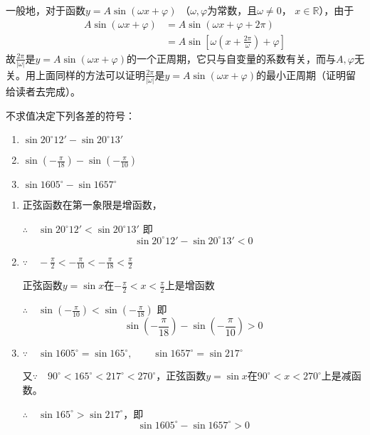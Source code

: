 一般地，对于函数$y=A\sin(\omega x+\varphi)$ （$\omega,\varphi$为常数，且$\omega\ne 0$， $x\in\mathbb{R}$），由于
\[\begin{split}
    A\sin(\omega x+\varphi)&=A\sin(\omega x+\varphi+2\pi)\\
    &=A\sin\left[\omega\left(x+\frac{2\pi}{\omega}\right)+\varphi\right]  
\end{split}\]
故$\frac{2\pi}{|\omega|}$是$y=A\sin(\omega x+\varphi)$的一个正周期，它只与自变量的系数有关，而与$A,\varphi$无关。用上面同样的方法可以证明$\frac{2\pi}{|\omega|}$是$y=A\sin(\omega x+\varphi)$的最小正周期（证明留给读者去完成）。

\begin{example}
不求值决定下列各差的符号：
\begin{enumerate}
    \item $\sin 20^{\circ}12'-\sin20^{\circ}13'$
    \item $\sin\left(-\frac{\pi}{18}\right)-\sin\left(-\frac{\pi}{10}\right)$
    \item $ \sin1605^{\circ}-\sin1657^{\circ}$
\end{enumerate}  
\end{example}

\begin{solution}
\begin{enumerate}
    \item 正弦函数在第一象限是增函数，
    
$\therefore\quad  \sin 20^{\circ}12'<\sin20^{\circ}13'$
即
    \[\sin 20^{\circ}12'-\sin20^{\circ}13'<0\]
\item $\because\quad -\frac{\pi}{2}<-\frac{\pi}{10}<-\frac{\pi}{18}<\frac{\pi}{2}$

正弦函数$y=\sin x$在$-\frac{\pi}{2}<x<\frac{\pi}{2}$上是增函数

$\therefore\quad \sin\left(-\frac{\pi}{10}\right)<\sin\left(-\frac{\pi}{18}\right)$
即
\[\sin\left(-\frac{\pi}{18}\right)-\sin\left(-\frac{\pi}{10}\right)>0\]

\item $\because\quad \sin 1605^{\circ}=\sin 165^{\circ},\qquad \sin 1657^{\circ}=\sin 217^{\circ}$

又$\because\quad 90^{\circ}<165^{\circ}<217^{\circ}<270^{\circ}$，正弦函数$y=\sin x$在$90^{\circ}<x<270^{\circ}$上是减函数。

$\therefore\quad \sin 165^{\circ}>\sin 217^{\circ}$，即
\[\sin 1605^{\circ}-\sin 1657^{\circ}>0\]
\end{enumerate}
\end{solution}

